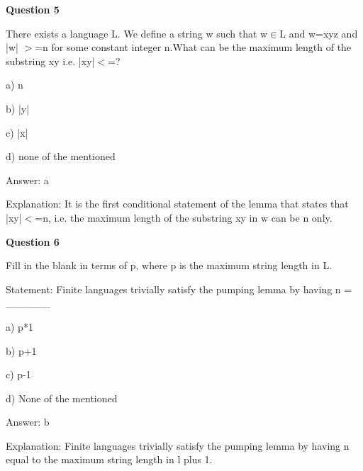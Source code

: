 \documentclass{article}
\begin{document}
\begin{mdframed}[linewidth=1pt, roundcorner=5pt, linecolor=gray!30, backgroundcolor=gray!5]
\textbf{Question 5} 

There exists a language L. We define a string w such that w$\in$L and w=xyz and |w| $>$=n for some constant integer n.What can be the maximum length of the substring xy i.e. |xy|$<$=?

a) n

b) |y|

c) |x|

d) none of the mentioned
\vspace{5pt} \par
\begin{tcolorbox}[colback=green!5, colframe=green!40!black, title=Solution]
Answer: a

Explanation: It is the first conditional statement of the lemma that states that |xy|$<$=n, i.e. the maximum length of the substring xy in w can be n only.
\end{tcolorbox}
\end{mdframed}

\begin{mdframed}[linewidth=1pt, roundcorner=5pt, linecolor=gray!30, backgroundcolor=gray!5]
\textbf{Question 6} 

Fill in the blank in terms of p, where p is the maximum string length in L.

Statement: Finite languages trivially satisfy the pumping lemma by having n = \_\_\_\_\_\_

a) p*1

b) p+1

c) p-1

d) None of the mentioned
\vspace{5pt} \par
\begin{tcolorbox}[colback=green!5, colframe=green!40!black, title=Solution]
Answer: b

Explanation: Finite languages trivially satisfy the pumping lemma by having n equal to the maximum string length in l plus 1.
\end{tcolorbox}
\end{mdframed}
\newpage
\end{document}
